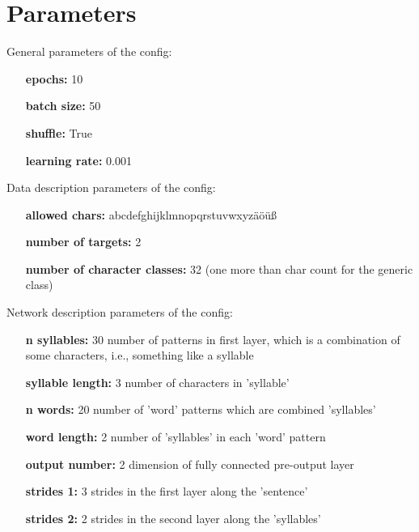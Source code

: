 \documentclass[a4paper,10pt,twoside]{article}
\begin{document}
 
\section{Parameters}

        General parameters of the config:
        

        \begin{itemize}
        \item[{\bf epochs:}] 10
        \item[{\bf batch size:}] 50
        \item[{\bf shuffle:}] True
        \item[{\bf learning rate:}] 0.001
        \end{itemize}
        

        
        Data description parameters of the config:
        

        \begin{itemize}
        \item[{\bf allowed chars:}] abcdefghijklmnopqrstuvwxyzäöüß 
        \item[{\bf number of targets:}] 2
        \item[{\bf number of character classes:}] 32 (one more than char count for the generic class)
        \end{itemize}
        

        
        Network description parameters of the config:
        

        \begin{itemize}
        \item[{\bf n syllables:}] 30 number of patterns in first layer, which is a combination of some characters, i.e., something like a syllable
        \item[{\bf syllable length:}] 3 number of characters in 'syllable'
        \item[{\bf n words:}] 20 number of 'word' patterns which are combined 'syllables'
        \item[{\bf word length:}] 2 number of 'syllables' in each 'word' pattern
        \item[{\bf output number:}] 2 dimension of fully connected pre-output layer
        \item[{\bf strides 1:}] 3 strides in the first layer along the 'sentence'
        \item[{\bf strides 2:}] 2 strides in the second layer along the 'syllables'
        \end{itemize}
        
\end{document}
